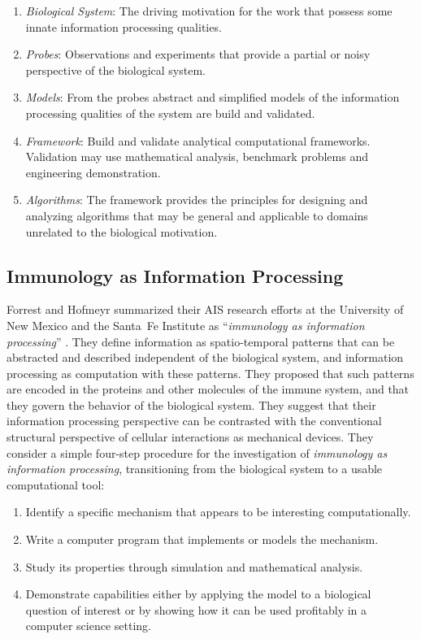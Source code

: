 \documentclass[a4paper, 11pt]{article}
\begin{document}
\begin{enumerate}
	\item \emph{Biological System}: The driving motivation for the work that possess some innate information processing qualities. 
	\item \emph{Probes}: Observations and experiments that provide a partial or noisy perspective of the biological system.
	\item \emph{Models}: From the probes abstract and simplified models of the information processing qualities of the system are build and validated.
	\item \emph{Framework}: Build and validate analytical computational frameworks. Validation may use mathematical analysis, benchmark problems and engineering demonstration.
	\item \emph{Algorithms}: The framework provides the principles for designing and analyzing algorithms that may be general and applicable to domains unrelated to the biological motivation.
\end{enumerate}



% 
% 
\subsection{Immunology as Information Processing}
Forrest and Hofmeyr summarized their AIS research efforts at the University of New Mexico and the Santa~Fe Institute as ``\emph{immunology as information processing}'' \cite{Forrest2001}. They define information as spatio-temporal patterns that can be abstracted and described independent of the biological system, and information processing as computation with these patterns. They proposed that such patterns are encoded in the proteins and other molecules of the immune system, and that they govern the behavior of the biological system. They suggest that their information processing perspective can be contrasted with the conventional structural perspective of cellular interactions as mechanical devices. They consider a simple four-step procedure for the investigation of \emph{immunology as information processing}, transitioning from the biological system to a usable computational tool:

\begin{enumerate}
	\item Identify a specific mechanism that appears to be interesting computationally.
	\item Write a computer program that implements or models the mechanism.
	\item Study its properties through simulation and mathematical analysis.
	\item Demonstrate capabilities either by applying the model to a biological question of interest or by showing how it can be used profitably in a computer science setting.
\end{enumerate}
\end{document}
